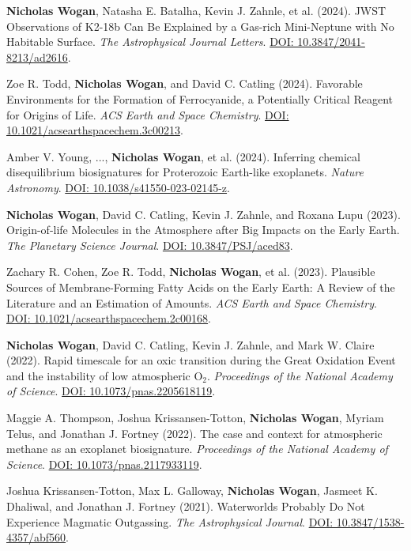 \documentclass[12pt]{article}
\begin{document}
\begin{cvlist}
\item[2024]
  \textbf{Nicholas Wogan}, Natasha E. Batalha, Kevin J. Zahnle, et al. (2024). JWST Observations of K2-18b Can Be Explained by a Gas-rich Mini-Neptune with No Habitable Surface. \emph{The Astrophysical Journal Letters}. \href{https://doi.org/10.3847/2041-8213/ad2616}{DOI: 10.3847/2041-8213/ad2616}.
\item[2024]
  Zoe R. Todd, \textbf{Nicholas Wogan}, and David C. Catling (2024). Favorable Environments for the Formation of Ferrocyanide, a Potentially Critical Reagent for Origins of Life. \emph{ACS Earth and Space Chemistry}. \href{https://doi.org/10.1021/acsearthspacechem.3c00213}{DOI: 10.1021/acsearthspacechem.3c00213}.
\item[2024]
  Amber V. Young, ..., \textbf{Nicholas Wogan}, et al. (2024). Inferring chemical disequilibrium biosignatures for Proterozoic Earth-like exoplanets. \emph{Nature Astronomy}. \href{https://doi.org/10.1038/s41550-023-02145-z}{DOI: 10.1038/s41550-023-02145-z}.
\item[2023]
  \textbf{Nicholas Wogan}, David C. Catling, Kevin J. Zahnle, and Roxana Lupu (2023). Origin-of-life Molecules in the Atmosphere after Big Impacts on the Early Earth. \emph{The Planetary Science Journal}. \href{https://doi.org/10.3847/PSJ/aced83}{DOI: 10.3847/PSJ/aced83}.
\item[2023]
  Zachary R. Cohen, Zoe R. Todd, \textbf{Nicholas Wogan}, et al. (2023). Plausible Sources of Membrane-Forming Fatty Acids on the Early Earth: A Review of the Literature and an Estimation of Amounts. \emph{ACS Earth and Space Chemistry}. \href{https://doi.org/10.1021/acsearthspacechem.2c00168}{DOI: 10.1021/acsearthspacechem.2c00168}.
\item[2022]
  \textbf{Nicholas Wogan}, David C. Catling, Kevin J. Zahnle, and Mark W. Claire (2022). Rapid timescale for an oxic transition during the Great Oxidation Event and the instability of low atmospheric O$_{2}$. \emph{Proceedings of the National Academy of Science}. \href{https://doi.org/10.1073/pnas.2205618119}{DOI: 10.1073/pnas.2205618119}.
\item[2022]
  Maggie A. Thompson, Joshua Krissansen-Totton, \textbf{Nicholas Wogan}, Myriam Telus, and Jonathan J. Fortney (2022). The case and context for atmospheric methane as an exoplanet biosignature. \emph{Proceedings of the National Academy of Science}. \href{https://doi.org/10.1073/pnas.2117933119}{DOI: 10.1073/pnas.2117933119}.
\item[2021]
  Joshua Krissansen-Totton, Max L. Galloway, \textbf{Nicholas Wogan}, Jasmeet K. Dhaliwal, and Jonathan J. Fortney (2021). Waterworlds Probably Do Not Experience Magmatic Outgassing. \emph{The Astrophysical Journal}. \href{https://doi.org/10.3847/1538-4357/abf560}{DOI: 10.3847/1538-4357/abf560}.

\end{cvlist}
\end{document}
